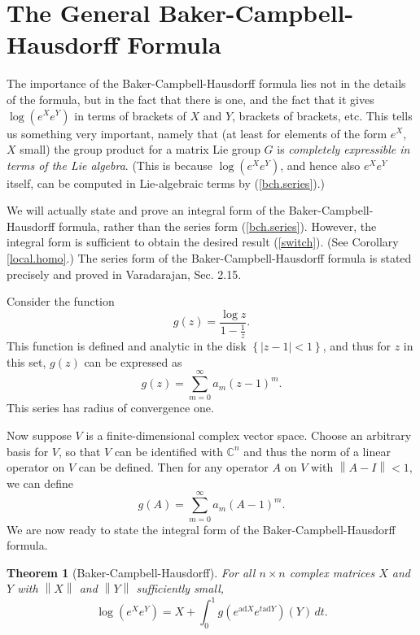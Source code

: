 \documentclass{amsbook}
\theoremstyle{plain}
\newtheorem{theorem}{Theorem}
\numberwithin{equation}{chapter}
\numberwithin{theorem}{chapter}
\begin{document}
\section{The General Baker-Campbell-Hausdorff Formula\label{bch.general}}

The importance of the Baker-Campbell-Hausdorff formula lies not in the details
of the formula, but in the fact that there is one, and the fact that it gives
$\log(e^{X}e^{Y})$ in terms of brackets of $X$ and $Y$, brackets of brackets,
etc. This tells us something very important, namely that (at least for
elements of the form $e^{X}$, $X$ small) the group product for a matrix Lie
group $G$ is \textit{completely expressible in terms of the Lie algebra}.
(This is because $\log\left(  e^{X}e^{Y}\right)  $, and hence also $e^{X}%
e^{Y}$ itself, can be computed in Lie-algebraic terms by (\ref{bch.series}).)

We will actually state and prove an integral form of the
Baker-Campbell-Hausdorff formula, rather than the series form
(\ref{bch.series}). However, the integral form is sufficient to obtain the
desired result (\ref{switch}). (See Corollary \ref{local.homo}.) The series
form of the Baker-Campbell-Hausdorff formula is stated precisely and proved in
Varadarajan, Sec. 2.15.

Consider the function
\[
g(z)=\frac{\log z}{1-\frac1z}\text{.}%
\]
This function is defined and analytic in the disk $\left\{  \left|
z-1\right|  <1\right\}  $, and thus for $z$ in this set, $g(z)$ can be
expressed as
\[
g(z)=\sum_{m=0}^{\infty}a_{m}(z-1)^{m}\text{.}%
\]
This series has radius of convergence one.

Now suppose $V$ is a finite-dimensional complex vector space. Choose an
arbitrary basis for $V$, so that $V$ can be identified with $\mathbb{C}^{n}$
and thus the norm of a linear operator on $V$ can be defined. Then for any
operator $A$ on $V$ with $\left\|  A-I\right\|  <1$, we can define
\[
g(A)=\sum_{m=0}^{\infty}a_{m}(A-1)^{m}\text{.}%
\]
We are now ready to state the integral form of the Baker-Campbell-Hausdorff formula.

\begin{theorem}
[Baker-Campbell-Hausdorff]\label{bch.theorem}For all $n\times n$ complex
matrices $X$ and $Y$ with $\left\|  X\right\|  $ and $\left\|  Y\right\|  $
sufficiently small,
\begin{equation}
\log\left(  e^{X}e^{Y}\right)  =X+\int_{0}^{1}g(e^{\mathrm{ad}X}%
e^{t\mathrm{ad}Y})(Y)\,dt\text{.}\label{bch.integral}%
\end{equation}
\end{theorem}
\end{document}
